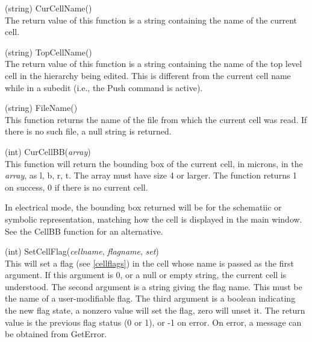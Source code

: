 \begin{description}
\item{(string) \vt CurCellName()}\\
The return value of this function is a string containing the name of
the current cell.

\item{(string) \vt TopCellName()}\\
The return value of this function is a string containing the name of
the top level cell in the hierarchy being edited.  This is different
from the current cell name while in a subedit (i.e., the {\cb Push}
command is active).

\item{(string) \vt FileName()}\\
This function returns the name of the file from which the current cell
was read.  If there is no such file, a null string is returned.

\item{(int) \vt CurCellBB({\it array\/})}\\
This function will return the bounding box of the current cell, in
microns, in the {\it array}, as l, b, r, t.  The array must have size 4
or larger.  The function returns 1 on success, 0 if there is no
current cell.

In electrical mode, the bounding box returned will be for the
schematiic or symbolic representation, matching how the cell is
displayed in the main window.  See the {\vt CellBB} function for
an alternative.

\item{(int) \vt SetCellFlag({\it cellname\/}, {\it flagname\/}, {\it set\/})}\\
This will set a flag (see \ref{cellflags}) in the cell whose name is
passed as the first argument.  If this argument is 0, or a null or
empty string, the current cell is understood.  The second argument is
a string giving the flag name.  This must be the name of a
user-modifiable flag.  The third argument is a boolean indicating the
new flag state, a nonzero value will set the flag, zero will unset it. 
The return value is the previous flag status (0 or 1), or -1 on error. 
On error, a message can be obtained from {\vt GetError}.
 

\end{description}
